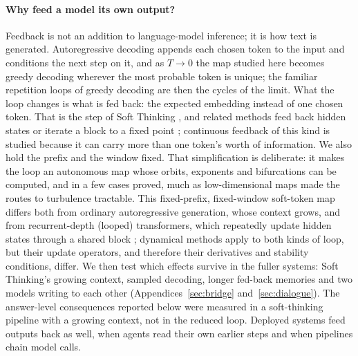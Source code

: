 \documentclass[11pt,letterpaper]{article}
\begin{document}
\paragraph{Why feed a model its own output?} Feedback is not an addition to language-model inference; it is how
text is generated. Autoregressive decoding appends each chosen token to the input and conditions the next step on it,
and as $T\to0$ the map studied here becomes greedy decoding wherever the most probable token is unique; the familiar
repetition loops of greedy decoding are then the cycles of the limit. What the loop changes is what is fed back: the expected embedding instead of one chosen token. That is the
step of Soft Thinking \cite{zhang2025softthinking}, and related methods feed back hidden states
\cite{hao2024coconut} or iterate a block to a fixed point \cite{geiping2025recurrent}; continuous feedback of this kind
is studied because it can carry more than one token's worth of information. We also hold the prefix and the window
fixed. That simplification is deliberate: it makes the loop an autonomous map whose orbits, exponents and bifurcations
can be computed, and in a few cases proved, much as low-dimensional maps made the routes to turbulence tractable.
This fixed-prefix, fixed-window soft-token map differs both from ordinary autoregressive generation, whose context grows,
and from recurrent-depth (looped) transformers, which repeatedly update hidden states through a shared block
\cite{dehghani2019universal,giannou2023looped,geiping2025recurrent}; dynamical methods apply to both kinds of loop, but
their update operators, and therefore their derivatives and stability conditions, differ. We then
test which effects survive in the fuller systems: Soft Thinking's growing context, sampled decoding, longer fed-back
memories and two models writing to each other (Appendices~\ref{sec:bridge} and~\ref{sec:dialogue}). The
answer-level consequences reported below were measured in a soft-thinking pipeline with a growing context, not in the
reduced loop. Deployed systems feed outputs back as well, when agents read their own earlier steps and when pipelines chain
model calls.
\end{document}
